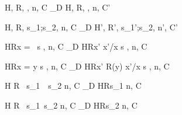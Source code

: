 \begin{figure}
  \begin{minipage}{\textwidth}

   {\langle H, R,
     \Endconst, n, C \rangle \rightarrow_{D} \langle
     H, R, \SKIP , n, C' \rangle}

\vspace{2mm}


\vspace{2mm}  


\vspace{2mm}

{\langle H, R, s_1;s_2, n, C \rangle \xlongrightarrow{\rho}_{D} \langle H', R', s_1';s_2, n', C' \rangle}
 
\vspace{2mm}

{\langle H\coma R\coma  \LET x = \NULL \ \IN s , n, C \rangle
  \longrightarrow_{D}
  \langle H\coma R\Lfc x' \mapsto \NULL \Rfc \coma   \Lb x'/x \Rb s , n, C  \rangle }

\vspace{2mm}

{\langle H\coma R\coma \LET x = y \; \IN s , n, C  \rangle
  \longrightarrow_{D}
  \langle H\coma R\Lfc x' \mapsto R(y) \Rfc \coma   \Lb x'/x \Rb s , n, C\rangle }

\vspace{2mm}

{\langle H \coma R \coma \IFNULL\Sirx \ \THEN   s_{1}\ \ELSE\  s_{2} \coma  n, C \rangle
  \rightarrow_{D}
  \langle H\coma R\coma s_{1} \coma n, C \rangle}

\vspace{2mm}

{\langle H \coma R \coma \IFNULL\Sirx\ \THEN  s_{1}\ \ELSE  s_{2} \coma  n, C\rangle
  \rightarrow_{D}
  \langle H\coma R\coma s_{2} \coma  n, C\rangle}



\end{minipage}
\end{figure}
